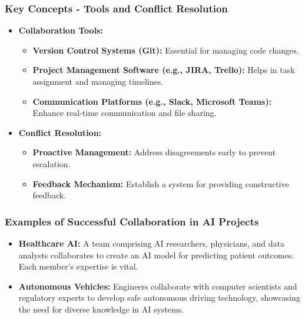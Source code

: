 \documentclass[aspectratio=169]{beamer}
\begin{document}
\begin{frame}[fragile]
    \frametitle{Key Concepts - Tools and Conflict Resolution}
    \begin{itemize}
        \item \textbf{Collaboration Tools:}
            \begin{itemize}
                \item \textbf{Version Control Systems (Git):} Essential for managing code changes.
                \item \textbf{Project Management Software (e.g., JIRA, Trello):} Helps in task assignment and managing timelines.
                \item \textbf{Communication Platforms (e.g., Slack, Microsoft Teams):} Enhance real-time communication and file sharing.
            \end{itemize}
        
        \item \textbf{Conflict Resolution:}
            \begin{itemize}
                \item \textbf{Proactive Management:} Address disagreements early to prevent escalation.
                \item \textbf{Feedback Mechanism:} Establish a system for providing constructive feedback.
            \end{itemize}
    \end{itemize}
\end{frame}

\begin{frame}[fragile]
    \frametitle{Examples of Successful Collaboration in AI Projects}
    \begin{itemize}
        \item \textbf{Healthcare AI:} A team comprising AI researchers, physicians, and data analysts collaborates to create an AI model for predicting patient outcomes. Each member's expertise is vital.
        
        \item \textbf{Autonomous Vehicles:} Engineers collaborate with computer scientists and regulatory experts to develop safe autonomous driving technology, showcasing the need for diverse knowledge in AI systems.
    \end{itemize}
\end{frame}
\end{document}
